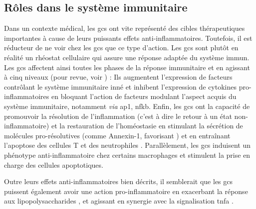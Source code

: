 \documentclass[../main.tex]{subfiles}
\begin{document}

\subsection{Rôles dans le système immunitaire}\label{subsec:gc-immune}
Dans un contexte médical, les \glspl{gc} ont vite représenté des cibles thérapeutiques importantes à cause de leurs puissants effets anti-inflammatoires.
Toutefois, il est réducteur de ne voir chez les \glspl{gc} que ce type d'action.
Les \glspl{gc} sont plutôt en réalité un rhéostat cellulaire qui assure une réponse adaptée du système immun.
Les \glspl{gc} affectent ainsi toutes les phases de la réponse immunitaire et en agissant à cinq niveaux (pour revue, voir \citealp{Busillo2013}) :
Ils augmentent l'expression de facteurs contrôlant le système immunitaire inné et inhibent l'expression de cytokines pro-inflammatoires en bloquant l'action de facteurs modulant l'aspect acquis du système immunitaire, notamment \textit{via} \gls{ap1}, \gls{nfkb}.
Enfin, les \glspl{gc} ont la capacité de promouvoir la résolution de l'inflammation (c'est à dire le retour à un état non-inflammatoire) et la restauration de l'homéostasie en stimulant la sécrétion de molécules pro-résolutives (comme Annexin-1, favorisant ) et en entraînant l'apoptose des cellules T et des neutrophiles \citep{Parrillo1979}.
Parallèlement, les \glspl{gc} induisent un phénotype anti-inflammatoire chez certains macrophages et stimulent la prise en charge des cellules apoptotiques.
\par
Outre leurs effets anti-inflammatoires bien décrits, il semblerait que les \glspl{gc} puissent également avoir une action pro-inflammatoire en exacerbant la réponse aux lipopolysaccharides \citep{Munhoz2010,Frank2012}, et agissant en synergie avec la signalisation \gls{tnfa} \citep{Lannan2012}.

\end{document}
